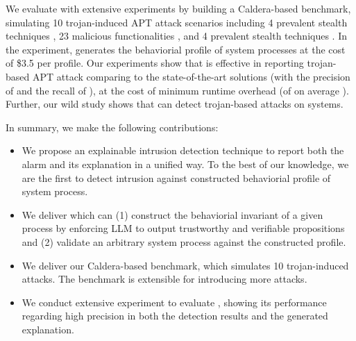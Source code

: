 We evaluate \tool with extensive experiments by building a Caldera-based benchmark,
simulating 10 trojan-induced APT attack scenarios including 
4 prevalent stealth techniques \cite{xx}, 
23 malicious functionalities \cite{xx}, and 
4 prevalent stealth techniques \cite{xx}.
In the experiment, \tool generates the behaviorial profile of  system processes
at the cost of \$3.5 per profile.
Our experiments show that 
\tool is effective in reporting trojan-based APT attack comparing to the state-of-the-art solutions (with the precision of  and the recall of ),
at the cost of minimum runtime overhead (of on average ).
Further, our wild study shows that \tool can detect  trojan-based attacks on  systems.

In summary, we make the following contributions:
\begin{itemize}
  \item We propose an explainable intrusion detection technique \tool to report both the alarm and its explanation in a unified way. 
      To the best of our knowledge, we are the first to detect intrusion against constructed behaviorial profile of system process.
  \item We deliver \tool which can 
    (1) construct the behaviorial invariant of a given process by enforcing LLM to output trustworthy and verifiable propositions and
    (2) validate an arbitrary system process against the constructed profile.
  \item We deliver our Caldera-based benchmark, which simulates 10 trojan-induced attacks. 
    The benchmark is extensible for introducing more attacks.
  \item We conduct extensive experiment to evaluate \tool, showing its performance regarding high precision in both the detection results and the generated explanation.
\end{itemize}
 





